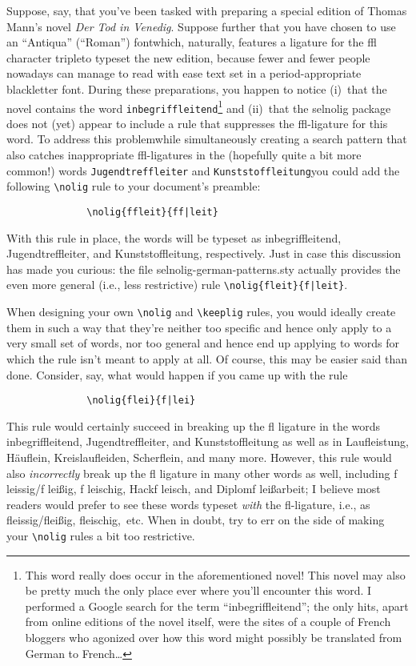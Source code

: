 \documentclass[11pt]{article}
\newcommand{\pkg}[1]{\textsf{#1}}
\newcommand{\opt}[1]{\texttt{#1}}
\newcommand{\cmmd}[1]{\texttt{\textbackslash #1}}
\begin{document}
Suppose, say, that you've been tasked with preparing a special edition of Thomas Mann's novel \emph{Der Tod in Venedig}. Suppose further that you have chosen to use an \enquote{Antiqua} (\enquote{Roman}) font\textemdash which, naturally, features a ligature for the ffl character triple\textemdash to typeset the new edition, because fewer and fewer people nowadays can manage to read with ease text set in a {\blackletterfont period-appropriate blackletter font}. During these preparations, you happen to notice (i)~that the novel contains the word \opt{inbegriffleitend}\footnote{This word really does occur in the aforementioned novel! This novel may also be pretty much the only place ever where you'll encounter this word. I performed a Google search for the term \enquote{inbegriffleitend}; the only hits, apart from online editions of the novel itself, were the sites of a couple of French bloggers who agonized over how this word might possibly be translated from German to French\dots} and (ii)~that the \pkg{selnolig} package does not (yet) appear to include a rule that suppresses the ffl-ligature for this word. To address this problem\textemdash while simultaneously creating a search pattern that also catches inappropriate ffl-ligatures in the (hopefully quite a bit more common!) words \opt{Jugendtreffleiter} and \opt{Kunststoffleitung}\textemdash you could add the following \Verb+\nolig+ rule to your document's preamble:
\begin{Verbatim}
              \nolig{ffleit}{ff|leit}
\end{Verbatim}
With this rule in place, the words will be typeset as inbegriffleitend, Jugendtreffleiter, and Kunststoffleitung, respectively. Just in case this discussion has made you curious: the file \pkg{selnolig-german-patterns.sty} actually provides the even more general (i.e., less restrictive) rule \Verb+\nolig{fleit}{f|leit}+.

When designing your own \cmmd{nolig} and \cmmd{keeplig} rules, you would ideally create them in such a way that they're neither too specific and hence only apply to a very small set of words, nor too general and hence end up applying to words for which the rule isn't meant to apply at all. Of course, this may be easier said than done. Consider, say, what would happen if you came up with the rule
\begin{Verbatim}
              \nolig{flei}{f|lei}
\end{Verbatim}
This rule would certainly succeed in breaking up the fl ligature in the words inbegriffleitend, Jugendtreffleiter, and Kunststoffleitung as well as in Laufleis\breaklig tung, Häuflein, Kreislaufleiden, Scherflein, and many more. However, this rule would also \emph{incorrectly} break up the fl ligature in many other words as well, including f\kern0pt leissig\slash f\kern0pt leißig, f\kern0pt leischig, Hackf\kern0pt leisch, and Diplomf\kern0pt leißarbeit; I believe most readers would prefer to see these words typeset \emph{with} the fl-ligature, i.e., as fleissig\slash fleißig, fleischig,~etc. When in doubt, try to err on the side of making your \cmmd{nolig} rules a bit too restrictive.
\end{document}
